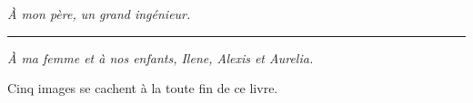 \cleardoublepage
\thispagestyle{empty}
\vspace*{5.2cm}
\begin{center}
{\Large\itshape À mon père, un grand ingénieur.}\par
\vspace{1.3cm}
{\color{okorange}\rule{1.6cm}{1pt}}\par
\vspace{1.3cm}
{\Large\itshape À ma femme et à nos enfants, Ilene, Alexis et Aurelia.}\par
\vspace*{\fill}
{\footnotesize\color{encre!70}Cinq images se cachent à la toute fin de ce livre.}\par
\vspace{1.2cm}
\end{center}
\clearpage
